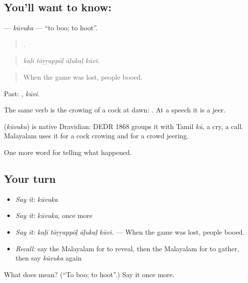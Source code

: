 \subsection*{You'll want to know: }
\textbf{} — \emph{kūvuka} — \textquotedblleft{}to boo; to hoot\textquotedblright{}.

\begin{quote}
   .
\end{quote}

\begin{quote}
\emph{kaḷi tōṟṟappōḷ āḷukaḷ kūvi.}
\end{quote}

\begin{quote}
When the game was lost, people booed.
\end{quote}

Past: , \emph{kūvi}.

The same verb is the crowing of a cock at dawn:  . At a speech it is a jeer.

\begin{cousinweb}
\textbf{} (\emph{kūvuka}) is native Dravidian: DEDR 1868 groups it with Tamil \emph{kū}, a cry, a call. Malayalam uses it for a cock crowing and for a crowd jeering.
\end{cousinweb}

\begin{grammarlens}[title={What you've built}]
One more word for telling what happened.
\end{grammarlens}

\subsection*{Your turn}
\begin{itemize}
\raggedright
  \item \emph{Say it:} \emph{kūvuka}
  \item \emph{Say it:} \emph{kūvuka}, once more
  \item \emph{Say it:} \emph{kaḷi tōṟṟappōḷ āḷukaḷ kūvi.} — When the game was lost, people booed.
  \item \emph{Recall:} say the Malayalam for to reveal, then the Malayalam for to gather, then say \emph{kūvuka} again
\end{itemize}

\begin{tcolorbox}[breakable,colback=teal!4,colframe=teal!35!black,title={Before you move on}]
What does  mean? (\textquotedblleft{}To boo; to hoot\textquotedblright{}.) Say it once more.
\end{tcolorbox}

